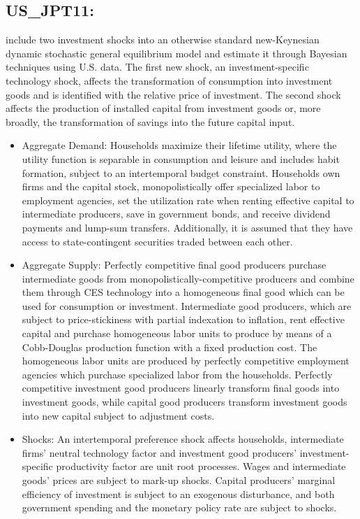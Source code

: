\documentclass[11pt,a4paper]{article}
\begin{document}
	\subsection{US\_JPT11: \cite{Justinianoetal2011}}
	\label{USJPT11}  
	\cite{Justinianoetal2011} include two investment shocks into an otherwise standard new-Keynesian dynamic stochastic general equilibrium model and estimate it through Bayesian techniques using U.S. data. The first new shock, an investment-specific technology shock, affects the transformation of consumption into investment goods and is identified with the relative price of investment. The second shock affects the production of installed capital from investment goods or, more broadly, the transformation of savings into the future capital input.
	\begin{itemize}
		\item Aggregate Demand: Households maximize their lifetime utility, where the utility function is separable in consumption and leisure and includes habit formation, subject to an intertemporal budget constraint. Households own firms and the capital stock, monopolistically offer specialized labor to employment agencies, set the utilization rate when renting effective capital to intermediate producers, save in government bonds, and receive dividend payments and lump-sum transfers. Additionally, it is assumed that they have access to state-contingent securities traded between each other. 
		\item Aggregate Supply: Perfectly competitive final good producers purchase intermediate goods from monopolistically-competitive producers and combine them through CES technology into a homogeneous final good which can be used for consumption or investment. Intermediate good producers, which are subject to \cite{Calvo1983} price-stickiness with partial indexation to inflation, rent effective capital and purchase homogeneous labor units to produce by means of a Cobb-Douglas production function with a fixed production cost. The homogeneous labor units are produced by perfectly competitive employment agencies which purchase specialized labor from the households. Perfectly competitive investment good producers linearly transform final goods into investment goods, while capital good producers transform investment goods into new capital subject to adjustment costs.
		\item Shocks: An intertemporal preference shock affects households, intermediate firms' neutral technology factor and investment good producers' investment-specific productivity factor are unit root processes. Wages and intermediate goods' prices are subject to mark-up shocks. Capital producers' marginal efficiency of investment is subject to an exogenous disturbance, and both government spending and the monetary policy rate are subject to shocks.

\end{itemize}
\end{document}
